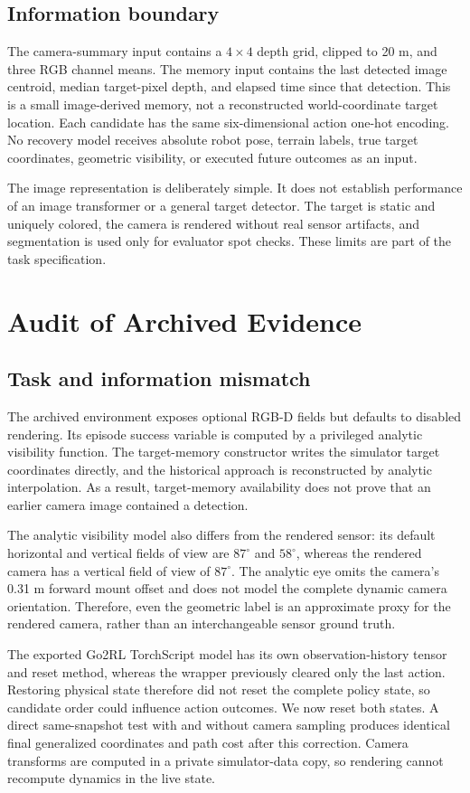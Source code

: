 \documentclass[10pt,twocolumn,a4paper]{article}
\begin{document}
\subsection{Information boundary}
The camera-summary input contains a $4\times4$ depth grid, clipped to 20 m, and three RGB channel means. The memory input contains the last detected image centroid, median target-pixel depth, and elapsed time since that detection. This is a small image-derived memory, not a reconstructed world-coordinate target location. Each candidate has the same six-dimensional action one-hot encoding. No recovery model receives absolute robot pose, terrain labels, true target coordinates, geometric visibility, or executed future outcomes as an input.

The image representation is deliberately simple. It does not establish performance of an image transformer or a general target detector. The target is static and uniquely colored, the camera is rendered without real sensor artifacts, and segmentation is used only for evaluator spot checks. These limits are part of the task specification.

\section{Audit of Archived Evidence}
\subsection{Task and information mismatch}
The archived environment exposes optional RGB-D fields but defaults to disabled rendering. Its episode success variable is computed by a privileged analytic visibility function. The target-memory constructor writes the simulator target coordinates directly, and the historical approach is reconstructed by analytic interpolation. As a result, target-memory availability does not prove that an earlier camera image contained a detection.

The analytic visibility model also differs from the rendered sensor: its default horizontal and vertical fields of view are $87^\circ$ and $58^\circ$, whereas the rendered camera has a vertical field of view of $87^\circ$. The analytic eye omits the camera's 0.31 m forward mount offset and does not model the complete dynamic camera orientation. Therefore, even the geometric label is an approximate proxy for the rendered camera, rather than an interchangeable sensor ground truth.

The exported Go2RL TorchScript model has its own observation-history tensor and reset method, whereas the wrapper previously cleared only the last action. Restoring physical state therefore did not reset the complete policy state, so candidate order could influence action outcomes. We now reset both states. A direct same-snapshot test with and without camera sampling produces identical final generalized coordinates and path cost after this correction. Camera transforms are computed in a private simulator-data copy, so rendering cannot recompute dynamics in the live state.
\end{document}
